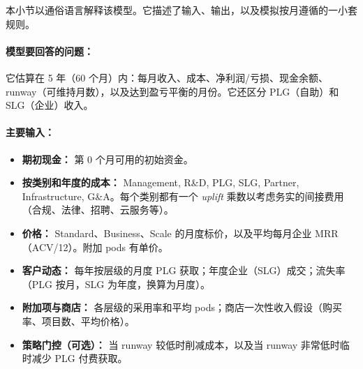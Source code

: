 \documentclass[11pt, a4paper, oneside]{article}
\begin{document}
本小节以通俗语言解释该模型。它描述了输入、输出，以及模拟按月遵循的一小套规则。

\paragraph{模型要回答的问题：}
它估算在 5 年（60 个月）内：每月收入、成本、净利润/亏损、现金余额、runway（可维持月数），以及达到盈亏平衡的月份。它还区分 PLG（自助）和 SLG（企业）收入。

\paragraph{主要输入：}
\begin{itemize}
\item \textbf{期初现金：} 第 0 个月可用的初始资金。
\item \textbf{按类别和年度的成本：} Management, R\&D, PLG, SLG, Partner, Infrastructure, G\&A。每个类别都有一个 \emph{uplift} 乘数以考虑务实的间接费用（合规、法律、招聘、云服务等）。
\item \textbf{价格：} Standard、Business、Scale 的月度标价，以及平均每月企业 MRR（ACV/12）。附加 pods 有单价。
\item \textbf{客户动态：} 每年按层级的月度 PLG 获取；年度企业（SLG）成交；流失率（PLG 按月，SLG 为年度，换算为月度）。
\item \textbf{附加项与商店：} 各层级的采用率和平均 pods；商店一次性收入假设（购买率、项目数、平均价格）。
\item \textbf{策略门控（可选）：} 当 runway 较低时削减成本，以及当 runway 非常低时临时减少 PLG 付费获取。
\end{itemize}
\end{document}
